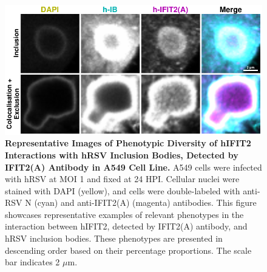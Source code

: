 \begin{figure}
    \centering
    \includegraphics[width=1\linewidth]{08. Chapter 3/Figs/02. Infection/02. IFIT2/01. IFIT2A/03. i2a-a549.pdf}
    \caption[Representative Images of Phenotypic Diversity of hIFIT2 Interactions with hRSV Inclusion Bodies, Detected by IFIT2(A) Antibody in A549 Cell Line.]{\textbf{Representative Images of Phenotypic Diversity of hIFIT2 Interactions with hRSV Inclusion Bodies, Detected by IFIT2(A) Antibody in A549 Cell Line.} A549 cells were infected with hRSV at MOI 1 and fixed at 24 HPI. Cellular nuclei were stained with DAPI (yellow), and cells were double-labeled with anti-RSV N (cyan) and anti-IFIT2(A) (magenta) antibodies. This figure showcases representative examples of relevant phenotypes in the interaction between hIFIT2, detected by IFIT2(A) antibody, and hRSV inclusion bodies. These phenotypes are presented in descending order based on their percentage proportions. The scale bar indicates 2 \(\mu \mbox{m}\).}
    \label{fig:Representative Images of Phenotypic Diversity of hIFIT2 Interactions with hRSV Inclusion Bodies, Detected by IFIT2(A) Antibody in A549 Cell Line}
\end{figure}

